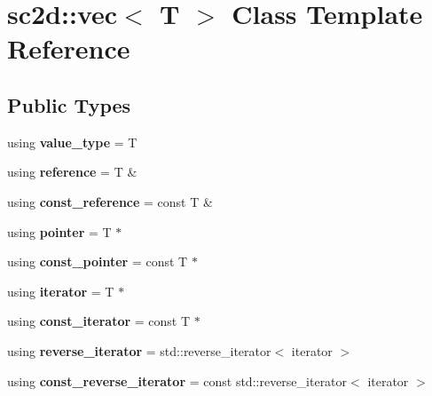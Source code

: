 \hypertarget{classsc2d_1_1vec}{}\section{sc2d\+:\+:vec$<$ T $>$ Class Template Reference}
\label{classsc2d_1_1vec}
\subsection*{Public Types}
\begin{DoxyCompactItemize}
\item 
\mbox{\label{classsc2d_1_1vec_ab6c903e0f0b443d34d1c0e4392771ba3}} 
using {\bfseries value\+\_\+type} = T
\item 
\mbox{\label{classsc2d_1_1vec_a666420d51dc57d3cb47f8fea7cb4eb61}} 
using {\bfseries reference} = T \&
\item 
\mbox{\label{classsc2d_1_1vec_a9ca0060222e65609a9a095e8864ae2c5}} 
using {\bfseries const\+\_\+reference} = const T \&
\item 
\mbox{\label{classsc2d_1_1vec_a245def5128e4dfaedc7ee67d128added}} 
using {\bfseries pointer} = T $\ast$
\item 
\mbox{\label{classsc2d_1_1vec_a9cce337645596edb51a9746c38df9825}} 
using {\bfseries const\+\_\+pointer} = const T $\ast$
\item 
\mbox{\label{classsc2d_1_1vec_a888c701b439a5ebadc8e87c1a0ec976c}} 
using {\bfseries iterator} = T $\ast$
\item 
\mbox{\label{classsc2d_1_1vec_ac783480885792fff20407dee2510496c}} 
using {\bfseries const\+\_\+iterator} = const T $\ast$
\item 
\mbox{\label{classsc2d_1_1vec_a47201f522d785dcc94dd21bcc95083b1}} 
using {\bfseries reverse\+\_\+iterator} = std\+::reverse\+\_\+iterator$<$ iterator $>$
\item 
\mbox{\label{classsc2d_1_1vec_a72356d64d1ce70c76960450ced3c910e}} 
using {\bfseries const\+\_\+reverse\+\_\+iterator} = const std\+::reverse\+\_\+iterator$<$ iterator $>$

\end{DoxyCompactItemize}
